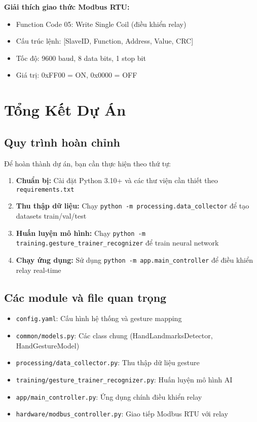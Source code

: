 \textbf{Giải thích giao thức Modbus RTU:}
\begin{itemize}
    \item Function Code 05: Write Single Coil (điều khiển relay)
    \item Cấu trúc lệnh: [SlaveID, Function, Address, Value, CRC]
    \item Tốc độ: 9600 baud, 8 data bits, 1 stop bit
    \item Giá trị: 0xFF00 = ON, 0x0000 = OFF
\end{itemize}


\section{Tổng Kết Dự Án}

\subsection{Quy trình hoàn chỉnh}
Để hoàn thành dự án, bạn cần thực hiện theo thứ tự:

\begin{enumerate}
    \item \textbf{Chuẩn bị:} Cài đặt Python 3.10+ và các thư viện cần thiết theo \texttt{requirements.txt}
    \item \textbf{Thu thập dữ liệu:} Chạy \texttt{python -m processing.data\_collector} để tạo datasets train/val/test
    \item \textbf{Huấn luyện mô hình:} Chạy \texttt{python -m training.gesture\_trainer\_recognizer} để train neural network
    \item \textbf{Chạy ứng dụng:} Sử dụng \texttt{python -m app.main\_controller} để điều khiển relay real-time
\end{enumerate}

\subsection{Các module và file quan trọng}
\begin{itemize}
    \item \texttt{config.yaml}: Cấu hình hệ thống và gesture mapping
    \item \texttt{common/models.py}: Các class chung (HandLandmarksDetector, HandGestureModel)
    \item \texttt{processing/data\_collector.py}: Thu thập dữ liệu gesture
    \item \texttt{training/gesture\_trainer\_recognizer.py}: Huấn luyện mô hình AI
    \item \texttt{app/main\_controller.py}: Ứng dụng chính điều khiển relay
    \item \texttt{hardware/modbus\_controller.py}: Giao tiếp Modbus RTU với relay
\end{itemize}

